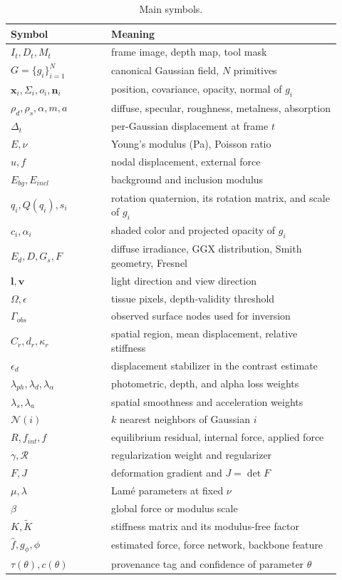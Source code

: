 \documentclass[pdflatex,lineno,referee,sn-vancouver,Numbered]{sn-jnl}
\begin{document}
\begin{table}[htbp]
\centering
\caption{Main symbols.}
\label{tab:notation}
\small
\begin{tabular}{@{}p{0.28\linewidth}p{0.64\linewidth}@{}}
\toprule
Symbol & Meaning \\
\midrule
$I_t, D_t, M_t$ & frame image, depth map, tool mask \\
$G=\{g_i\}_{i=1}^{N}$ & canonical Gaussian field, $N$ primitives \\
$\mathbf{x}_i, \Sigma_i, o_i, \mathbf{n}_i$ & position, covariance, opacity, normal of $g_i$ \\
$\rho_d,\rho_s,\alpha,m,a$ & diffuse, specular, roughness, metalness, absorption \\
$\Delta_t$ & per-Gaussian displacement at frame $t$ \\
$E, \nu$ & Young's modulus (Pa), Poisson ratio \\
$u, f$ & nodal displacement, external force \\
$E_{bg}, E_{incl}$ & background and inclusion modulus \\
$q_i, Q(q_i), s_i$ & rotation quaternion, its rotation matrix, and scale of $g_i$ \\
$c_i, \alpha_i$ & shaded color and projected opacity of $g_i$ \\
$E_d, D, G_s, F$ & diffuse irradiance, GGX distribution, Smith geometry, Fresnel \\
$\mathbf{l}, \mathbf{v}$ & light direction and view direction \\
$\Omega, \epsilon$ & tissue pixels, depth-validity threshold \\
$\Gamma_{obs}$ & observed surface nodes used for inversion \\
$C_r, d_r, \kappa_r$ & spatial region, mean displacement, relative stiffness \\
$\epsilon_d$ & displacement stabilizer in the contrast estimate \\
$\lambda_{ph},\lambda_d,\lambda_\alpha$ & photometric, depth, and alpha loss weights \\
$\lambda_s,\lambda_a$ & spatial smoothness and acceleration weights \\
$\mathcal{N}(i)$ & $k$ nearest neighbors of Gaussian $i$ \\
$R, f_{int}, f$ & equilibrium residual, internal force, applied force \\
$\gamma, \mathcal{R}$ & regularization weight and regularizer \\
$F, J$ & deformation gradient and $J=\det F$ \\
$\mu, \lambda$ & Lam\'e parameters at fixed $\nu$ \\
$\beta$ & global force or modulus scale \\
$K, \tilde{K}$ & stiffness matrix and its modulus-free factor \\
$\hat{f}, g_\phi, \phi$ & estimated force, force network, backbone feature \\
$\tau(\theta), c(\theta)$ & provenance tag and confidence of parameter $\theta$ \\
\bottomrule
\end{tabular}
\end{table}
\end{document}
